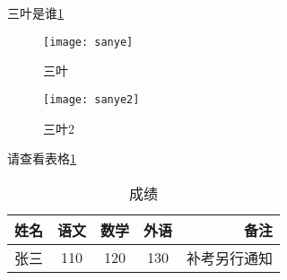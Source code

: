 \documentclass{article}
\begin{document}
	 	三叶是谁\ref{sanyeye} \\
	 	\begin{figure}[htbp]  %
			
	 		\centering 
	 		\texttt{[image: sanye]} \label{sanyeye}
	 		\caption{三叶}
			\texttt{[image: sanye2]} 
			\caption{三叶2}
	
		\end{figure}
		
		请查看表格\ref{tab-score} \\		
		\begin{table}
			\centering
			\begin{tabular}{|l|c|c|c|r|}
			\hline
			姓名 & 语文 & 数学 & 外语 & 备注 \\
			\hline
			张三 & 110 & 120 & 130 & 补考另行通知 \\
			\hline
			
			\end{tabular}
			\caption{成绩} \label{tab-score}
		\end{table}
	
\end{document}
